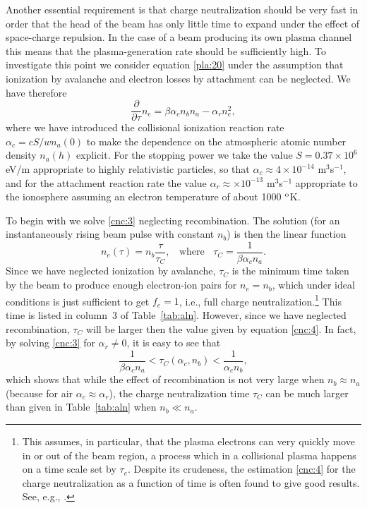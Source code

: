 \documentclass [12pt,a4paper,     ]{report} %
\begin{document}
  
   Another essential requirement is that charge neutralization should be very fast in order that the head of the beam has only little time to expand under the effect of space-charge repulsion.  In the case of a beam producing its own plasma channel this means that the plasma-generation rate should be sufficiently high.  To investigate this point we consider equation \eqref{pla:20} under the assumption that ionization by avalanche and electron losses by attachment can be neglected.  We have therefore
%
\begin{equation}\label{cnc:3} %
       \frac{\partial}{\partial\tau} n_e =  \beta \alpha_c n_b n_a
                                                - \alpha_r n_e^2,
\end{equation}
%
where we have introduced the collisional ionization reaction rate $\alpha_c = cS/wn_a(0)$ to make the dependence on the atmospheric atomic number density $n_a(h)$ explicit.  For the stopping power we take the value $S = 0.37 \times 10^{6}$  eV/m appropriate to highly relativistic particles, so that $\alpha_c  \approx 4 \times 10^{-14}$ m$^3$s$^{-1}$, and for the attachment reaction rate the value $\alpha_r  \approx  \times 10^{-13}$ m$^3$s$^{-1}$ appropriate to the ionosphere assuming an electron temperature of about 1000 $^{\rm{o}}$K.

  To begin with we solve  \eqref{cnc:3} neglecting recombination. The solution (for an instantaneously rising beam pulse with constant $n_b$) is then the linear function
%
\begin{equation}\label{cnc:4} %
      n_e(\tau)  = n_b \frac{\tau}{\tau_C }, ~~ ~~ \text{where} ~~ ~~ 
         \tau_C  =     \frac{1}{\beta \alpha_c n_a}.
\end{equation}
%
Since we have neglected ionization by avalanche, $\tau_C$ is the minimum time taken by the beam to produce enough electron-ion pairs for $n_e=n_b$, which under ideal conditions is just sufficient to get $f_e=1$, i.e., full charge neutralization.\footnote{This assumes, in particular, that the plasma electrons can very quickly move in or out of the beam region, a process which in a collisional plasma happens on a time scale set by $\tau_e$.  Despite its crudeness, the estimation \eqref{cnc:4} for the charge neutralization as a function of time is often found to give good results.  See, e.g., \cite{NGUYE1987-}.} This time is listed in column~3 of Table~\ref{tab:aln}.  However, since we have neglected recombination, $\tau_C$ will be larger then the value given by equation \eqref{cnc:4}.  In fact, by solving \eqref{cnc:3} for $\alpha_r \neq 0$, it is easy to see that
%
\begin{equation}\label{cnc:5} %
             \frac{1}{\beta \alpha_c n_a}
                   < \tau_C(\alpha_c,n_b)
                 < \frac{1}{\alpha_c n_b},
\end{equation}
%
which shows that while the effect of recombination is not very large when $n_b \approx n_a$ (because for air $\alpha_c \approx \alpha_r$), the charge neutralization time $\tau_C$ can be much larger than given in Table~\ref{tab:aln} when $n_b \ll n_a$.
\end{document}
